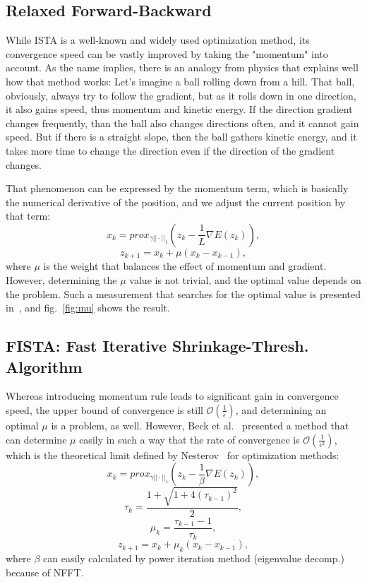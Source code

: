\subsection{Relaxed Forward-Backward}
While ISTA is a well-known and widely used optimization method, its convergence speed can be vastly improved by taking the "momentum" into account. As the name implies, there is an analogy from physics that explains well how that method works: Let's imagine a ball rolling down from a hill. That ball, obviously, always try to follow the gradient, but as it rolls down in one direction, it also gains speed, thus momentum and kinetic energy. If the direction gradient changes frequently, than the ball also changes directions often, and it cannot gain speed. But if there is a straight slope, then the ball gathers kinetic energy, and it takes more time to change the direction even if the direction of the gradient changes.

That phenomenon can be expressed by the momentum term, which is basically the numerical derivative of the position, and we adjust the current position by that term:
$$x_k = prox_{ \gamma || \cdot ||_1}(z_k - \frac{1}{L} \nabla E(z_k)),$$
$$z_{k+1} = x_k + \mu (x_k - x_{k-1}),$$
where $\mu$ is the weight that balances the effect of momentum and gradient. However, determining the $\mu$ value is not trivial, and the optimal value depends on the problem. Such a measurement that searches for the optimal value is presented in~\cite{peyre_2011}, and fig.~\ref{fig:mu} shows the result.


\subsection{FISTA: Fast Iterative Shrinkage-Thresh. Algorithm}
Whereas introducing momentum rule leads to significant gain in convergence speed, the upper bound of convergence is still $\mathcal{O}(\frac{1}{\epsilon})$, and determining an optimal $\mu$ is a problem, as well. However, Beck et al.~\cite{FISTA} presented a method that can determine $\mu$ easily in such a way that the rate of convergence is $\mathcal{O}(\frac{1}{\epsilon^2})$, which is the theoretical limit defined by Nesterov~\cite{nesterov_1983} for optimization methods:
$$x_k = prox_{ \gamma || \cdot ||_1}(z_k - \frac{1}{\beta} \nabla E(z_k)),$$
$$\tau_k = \frac{1 + \sqrt{1 + 4(\tau_{k-1})^2}}{2},$$
$$\mu_k = \frac{\tau_{k-1} - 1}{\tau_k},$$
$$z_{k+1} = x_k + \mu_k (x_k - x_{k-1}),$$
where $\beta$ can easily calculated by power iteration method (eigenvalue decomp.) because of NFFT.

